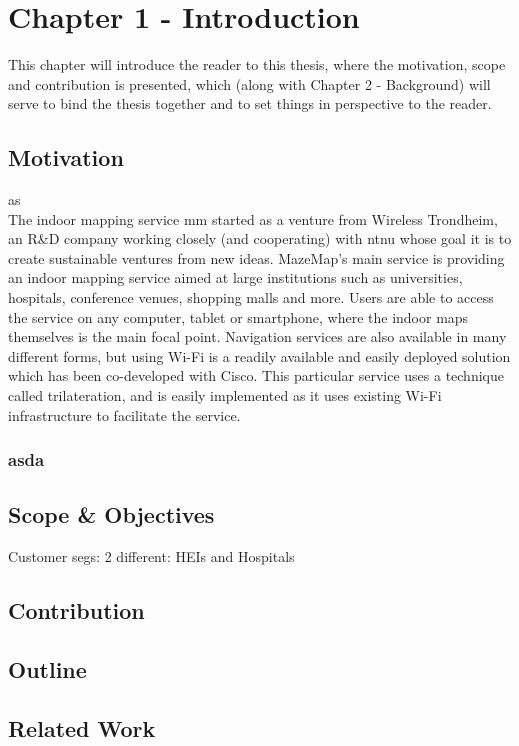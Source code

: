 \chapter{Chapter 1 - Introduction}
This chapter will introduce the reader to this thesis, where the motivation, scope and contribution is presented, which (along with Chapter 2 - Background) will serve to bind the thesis together and to set things in perspective to the reader.
\section{Motivation}
as
\newline
\\
The indoor mapping service \gls{mm} started as a venture from Wireless Trondheim, an R\&D company working closely (and cooperating) with \gls{ntnu} whose goal it is to create sustainable ventures from new ideas. MazeMap's main service is providing an indoor mapping service aimed at large institutions such as universities, hospitals, conference venues, shopping malls and more. Users are able to access the service on any computer, tablet or smartphone, where the indoor maps themselves is the main focal point. Navigation services are also available in many different forms, but using Wi-Fi is a readily available and easily deployed solution which has been co-developed with Cisco. This particular service uses a technique called trilateration\cite{DBLP:journals/corr/BiczokMJK14}, and is easily implemented as it uses existing Wi-Fi infrastructure to facilitate the service.
\subsection{asda}

\section{Scope \& Objectives}
Customer segs: 2 different: HEIs and Hospitals
\section{Contribution}

\section{Outline}

\section{Related Work}